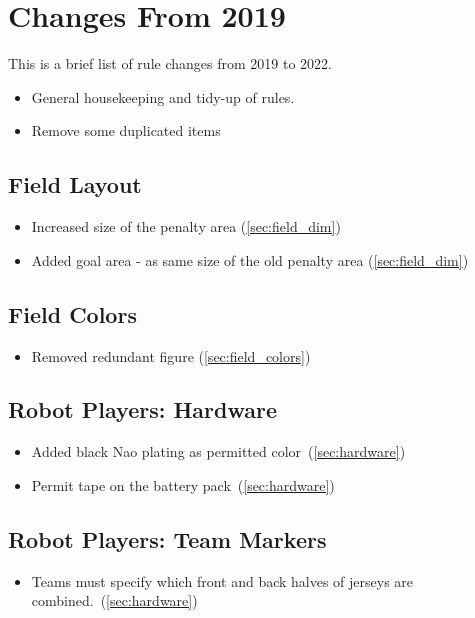 \section{Changes From 2019}
This is a brief list of rule changes from 2019 to 2022.

\begin{itemize}
  \item General housekeeping and tidy-up of rules.
  \item Remove some duplicated items
\end{itemize}

\subsection*{Field Layout}
\begin{itemize}
  \item Increased size of the penalty area (\cf \cref{sec:field_dim})
  \item Added goal area - as same size of the old penalty area (\cf \cref{sec:field_dim})
\end{itemize}

\subsection*{Field Colors}
\begin{itemize}
  \item Removed redundant figure (\cf \cref{sec:field_colors})
\end{itemize}

\subsection*{Robot Players: Hardware}
\begin{itemize}
  \item Added black Nao plating as permitted color~(\cf \cref{sec:hardware})
  \item Permit tape on the battery pack~(\cf \cref{sec:hardware})
\end{itemize}

\subsection*{Robot Players: Team Markers}
\begin{itemize}
  \item Teams must specify which front and back halves of jerseys are combined.~(\cf \cref{sec:hardware})
\end{itemize}

